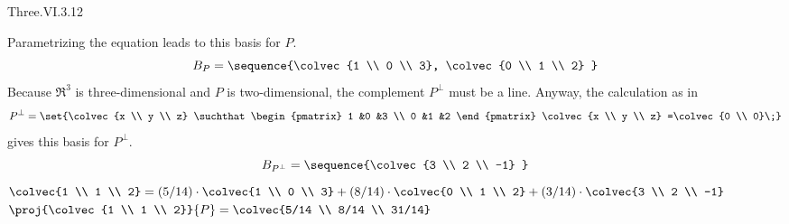 \begin{ans}{Three.VI.3.12}
      \begin{exparts}
        \partsitem Parametrizing the equation leads to this basis for
          $P$.
          \begin{equation*}
            B_P=\sequence{\colvec{1 \\ 0 \\ 3},
                          \colvec{0 \\ 1 \\ 2} }
          \end{equation*}
        \partsitem Because $\Re^3$ is three-dimensional
          and $P$ is two-dimensional, the complement $P^\perp$ must be
          a line.
          Anyway, the calculation as in 
          \begin{equation*}
            P^\perp=\set{\colvec{x \\ y \\ z}
                         \suchthat
                         \begin{pmatrix}
                           1  &0 &3  \\
                           0  &1 &2
                         \end{pmatrix}
                         \colvec{x \\ y \\ z}
                         =\colvec{0 \\ 0}\;}
          \end{equation*}
          gives this basis for $P^\perp$.
          \begin{equation*}
            B_{P^\perp}=\sequence{\colvec{3 \\ 2 \\ -1} }
          \end{equation*}
        \partsitem $ \displaystyle
             \colvec{1 \\ 1 \\ 2}=
             (5/14)\cdot\colvec{1 \\ 0 \\ 3}+
             (8/14)\cdot\colvec{0 \\ 1 \\ 2}+
             (3/14)\cdot\colvec{3 \\ 2 \\ -1}$
        \partsitem $\proj{\colvec{1 \\ 1 \\ 2}}{P}
          =\colvec{5/14 \\ 8/14 \\ 31/14}$

\end{exparts}
\end{ans}
